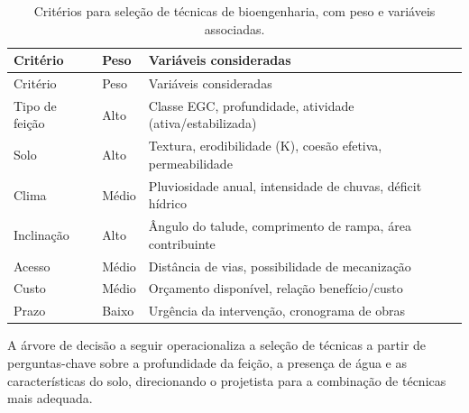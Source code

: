\documentclass[
  portuguese,
  11pt,
  a4paper,
  open=any]{scrbook}
\begin{document}
\begin{longtable}[]{@{}
  >{\raggedright\arraybackslash}p{}
  >{\raggedright\arraybackslash}p{}
  >{\raggedright\arraybackslash}p{}@{}}
\caption{Critérios para seleção de técnicas de bioengenharia, com peso e
variáveis associadas.}\label{tbl-selecao}\tabularnewline
\toprule\noalign{}
\begin{minipage}[b]{\linewidth}\raggedright
Critério
\end{minipage} & \begin{minipage}[b]{\linewidth}\raggedright
Peso
\end{minipage} & \begin{minipage}[b]{\linewidth}\raggedright
Variáveis consideradas
\end{minipage} \\
\midrule\noalign{}
\endfirsthead
\toprule\noalign{}
\begin{minipage}[b]{\linewidth}\raggedright
Critério
\end{minipage} & \begin{minipage}[b]{\linewidth}\raggedright
Peso
\end{minipage} & \begin{minipage}[b]{\linewidth}\raggedright
Variáveis consideradas
\end{minipage} \\
\midrule\noalign{}
\endhead
\bottomrule\noalign{}
\endlastfoot
Tipo de feição & Alto & Classe EGC, profundidade, atividade
(ativa/estabilizada) \\
Solo & Alto & Textura, erodibilidade (K), coesão efetiva,
permeabilidade \\
Clima & Médio & Pluviosidade anual, intensidade de chuvas, déficit
hídrico \\
Inclinação & Alto & Ângulo do talude, comprimento de rampa, área
contribuinte \\
Acesso & Médio & Distância de vias, possibilidade de mecanização \\
Custo & Médio & Orçamento disponível, relação benefício/custo \\
Prazo & Baixo & Urgência da intervenção, cronograma de obras \\
\end{longtable}

A árvore de decisão a seguir operacionaliza a seleção de técnicas a
partir de perguntas-chave sobre a profundidade da feição, a presença de
água e as características do solo, direcionando o projetista para a
combinação de técnicas mais adequada.
\end{document}
